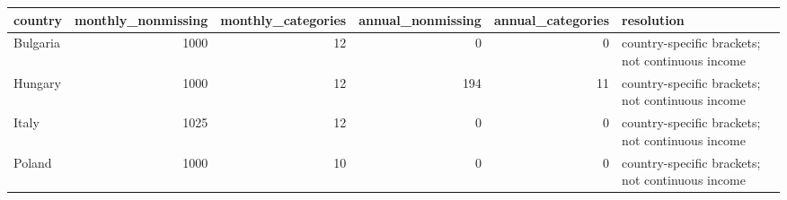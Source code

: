 \begin{tabular}{lrrrrl}
\toprule
country & monthly_nonmissing & monthly_categories & annual_nonmissing & annual_categories & resolution \\
\midrule
Bulgaria & 1000 & 12 & 0 & 0 & country-specific brackets; not continuous income \\
Hungary & 1000 & 12 & 194 & 11 & country-specific brackets; not continuous income \\
Italy & 1025 & 12 & 0 & 0 & country-specific brackets; not continuous income \\
Poland & 1000 & 10 & 0 & 0 & country-specific brackets; not continuous income \\
\bottomrule
\end{tabular}
